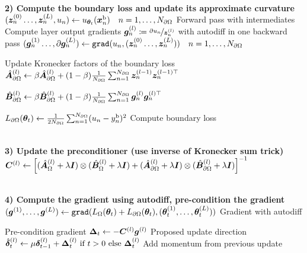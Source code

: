 \begin{algorithm}[!h]
\begin{small}
\begin{algorithmic}
        \\
        \State \textbf{2) Compute the boundary loss and update its approximate curvature}
        \State $({\bm{z}}_n^{(0)}\dots, {\bm{z}}_n^{(L)}, u_n) \gets u_{{\bm{\theta}}_t}({\bm{x}}_n^{\text{b}})\quad n=1, \dots, N_{\partial\Omega}$ \Comment Forward pass with intermediates
        \State Compute layer output gradients ${\bm{g}}_n^{(l)} \coloneqq \nicefrac{\partial u_n}{{\bm{z}}^{(l)}_n}$ with autodiff in one backward pass
        \State $({\bm{g}}_n^{(1)}\dots, \partial{\bm{g}}_n^{(L)}) \gets \texttt{grad}(u_n, ({\bm{z}}_n^{(0)}\dots, {\bm{z}}_n^{(L)}))\quad n=1, \dots, N_{\partial\Omega}$

         \Comment Update Kronecker factors of the boundary loss
          \State $\hat{{\bm{A}}}_{\partial\Omega}^{(l)} \gets \beta \hat{{\bm{A}}}_{\partial\Omega}^{(l)} + (1-\beta) \frac1{N_{\partial\Omega}} \sum_{n=1}^{N_{\partial\Omega}} {\bm{z}}_n^{(l-1)} {\bm{z}}_n^{(l-1)\top}$

          \State $\hat{{\bm{B}}}_{\partial\Omega}^{(l)} \gets \beta \hat{{\bm{B}}}_{\partial\Omega}^{(l)} + (1-\beta) \frac1{N_{\partial\Omega}} \sum_{n=1}^{N_{\partial\Omega}} {\bm{g}}_n^{(l)} {\bm{g}}_n^{(l)\top}$
        \EndFor

        \State $L_{\partial\Omega}({\bm{\theta}}_t) \gets \frac{1}{2 N_{\partial\Omega}}\sum_{n=1}^{N_{\partial\Omega}} (u_n - y^{\text{b}}_n)^2$ \Comment Compute boundary loss

        \\
        \State \textbf{3) Update the preconditioner (use inverse of Kronecker sum trick)}
          \State $ {\bm{C}}^{(l)} \gets \left[(\hat{{\bm{A}}}_{\Omega}^{(l)} + \lambda {\bm{I}}) \otimes (\hat{{\bm{B}}}_{\Omega}^{(l)} + \lambda {\bm{I}}) + (\hat{{\bm{A}}}_{\partial\Omega}^{(l)} + \lambda {\bm{I}}) \otimes (\hat{{\bm{B}}}_{\partial\Omega}^{(l)} + \lambda {\bm{I}})  \right]^{-1}$
        \EndFor

        \\
        \State \textbf{4) Compute the gradient using autodiff, pre-condition the gradient}
        \State $({\bm{g}}^{(1)}, \dots, {\bm{g}}^{(L)}) \gets \texttt{grad}( L_{\Omega}({\bm{\theta}}_t) + L_{\partial\Omega}({\bm{\theta}}_t), ({\bm{\theta}}_t^{(1)}, \dots, {\bm{\theta}}^{(L)}_t ))$ \Comment Gradient with autodiff

          \Comment Pre-condition gradient
          \State ${\bm{\Delta}}_t \gets - {\bm{C}}^{(l)} {\bm{g}}^{(l)}$ \Comment Proposed update direction
          \State $\hat{{\bm{\delta}}}_t^{(l)} \gets \mu {\bm{\delta}}_{t-1}^{(l)} + {\bm{\Delta}}_t^{(l)} \text{ if $t>0$ else } {\bm{\Delta}}_t^{(l)}$ \Comment Add momentum from previous update
        \EndFor


\end{algorithmic}
\end{small}
\end{algorithm}

